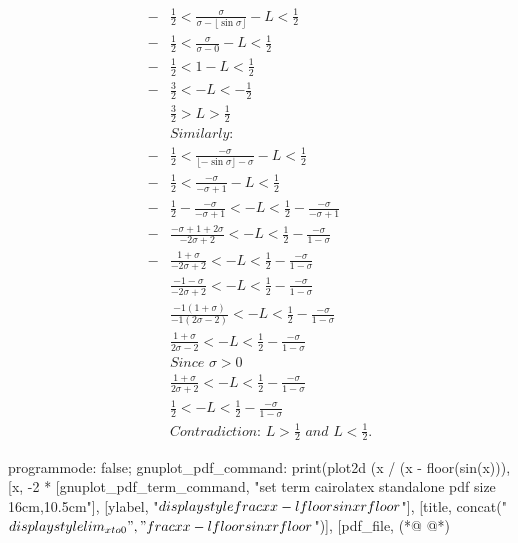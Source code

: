 \documentclass[a4paper]{article}
\begin{document}
\begin{align*}
  -&\frac{1}{2}
  < \frac{\sigma}{\sigma - \lfloor \sin \sigma \rfloor} - L
  < \frac{1}{2} \\
  -&\frac{1}{2} < \frac{\sigma}{\sigma - 0} - L < \frac{1}{2} \\
  -&\frac{1}{2} < 1 - L < \frac{1}{2} \\
  -&\frac{3}{2} < -L < -\frac{1}{2} \\
   &\frac{3}{2} > L > \frac{1}{2} \\
   &\textit{Similarly:} \\
  -&\frac{1}{2}
  < \frac{-\sigma}{\lfloor - \sin \sigma \rfloor -\sigma} - L
  < \frac{1}{2}\\
  -&\frac{1}{2} < \frac{-\sigma}{-\sigma + 1} - L < \frac{1}{2} \\
  -&\frac{1}{2} - \frac{-\sigma}{-\sigma + 1} < -L
  < \frac{1}{2} - \frac{-\sigma}{-\sigma + 1} \\
  -&\frac{-\sigma + 1 + 2\sigma}{-2\sigma + 2}
  < -L < \frac{1}{2} - \frac{-\sigma}{1 - \sigma} \\
  -&\frac{1 + \sigma}{-2\sigma + 2} < -L
  < \frac{1}{2} - \frac{-\sigma}{1 - \sigma} \\
   &\frac{-1 - \sigma}{-2\sigma + 2} < -L
  < \frac{1}{2} - \frac{-\sigma}{1 - \sigma} \\
   &\frac{-1(1 + \sigma)}{-1(2\sigma - 2)} < -L
  < \frac{1}{2} - \frac{-\sigma}{1 - \sigma} \\
   &\frac{1 + \sigma}{2\sigma - 2} < -L
  < \frac{1}{2} - \frac{-\sigma}{1 - \sigma} \\
   &\textit{Since $\sigma > 0$} \\
   &\frac{1 + \sigma}{2\sigma + 2} < -L
  < \frac{1}{2} - \frac{-\sigma}{1 - \sigma} \\
   &\frac{1}{2} < -L < \frac{1}{2} - \frac{-\sigma}{1 - \sigma} \\
   &\textit{Contradiction: $L > \frac{1}{2}$ and $L < \frac{1}{2}$.}
\end{align*}

\begin{maxima}
programmode: false;
gnuplot_pdf_command: %
print(plot2d (x / (x - floor(sin(x))),
    [x, -2 * %
    [gnuplot_pdf_term_command, 
     "set term cairolatex standalone pdf size 16cm,10.5cm"],
    [ylabel, "${\\displaystyle \\frac{x}{x - \\lfloor \\sin x \\rfloor}}$"],
    [title, concat("${\\displaystyle \\lim_{x \\to 0}",
               "\\frac{x}{x - \\lfloor \\sin x \\rfloor}}$")],
    [pdf_file, %
(*@\label{orgsrcblock3}
@*)
\end{maxima}
\end{document}

